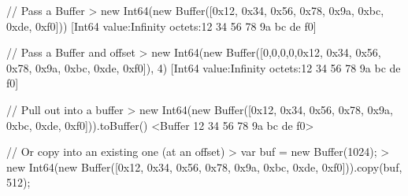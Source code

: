 \begin{DoxyCode}
// Pass a Buffer
> new Int64(new Buffer([0x12, 0x34, 0x56, 0x78, 0x9a, 0xbc, 0xde, 0xf0]))
[Int64 value:Infinity octets:12 34 56 78 9a bc de f0]

// Pass a Buffer and offset
> new Int64(new Buffer([0,0,0,0,0x12, 0x34, 0x56, 0x78, 0x9a, 0xbc, 0xde, 0xf0]), 4)
[Int64 value:Infinity octets:12 34 56 78 9a bc de f0]

// Pull out into a buffer
> new Int64(new Buffer([0x12, 0x34, 0x56, 0x78, 0x9a, 0xbc, 0xde, 0xf0])).toBuffer()
<Buffer 12 34 56 78 9a bc de f0>

// Or copy into an existing one (at an offset)
> var buf = new Buffer(1024);
> new Int64(new Buffer([0x12, 0x34, 0x56, 0x78, 0x9a, 0xbc, 0xde, 0xf0])).copy(buf, 512);
\end{DoxyCode}
 